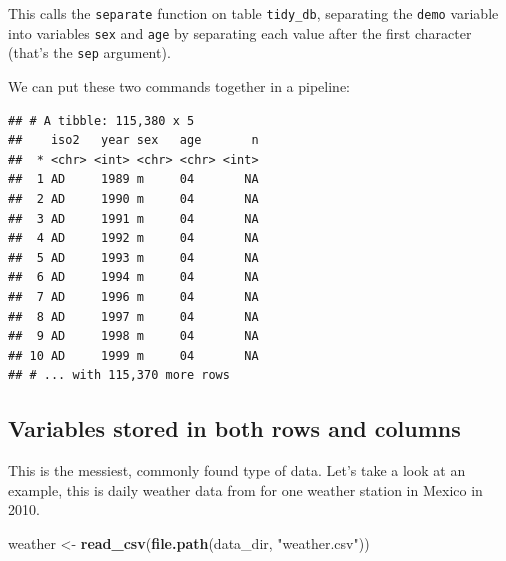\documentclass[12pt,]{book}
\newenvironment{Shaded}{\begin{snugshade}}{\end{snugshade}}
\newcommand{\KeywordTok}[1]{\textcolor[rgb]{0.13,0.29,0.53}{\textbf{#1}}}
\newcommand{\DataTypeTok}[1]{\textcolor[rgb]{0.13,0.29,0.53}{#1}}
\newcommand{\DecValTok}[1]{\textcolor[rgb]{0.00,0.00,0.81}{#1}}
\newcommand{\StringTok}[1]{\textcolor[rgb]{0.31,0.60,0.02}{#1}}
\newcommand{\OperatorTok}[1]{\textcolor[rgb]{0.81,0.36,0.00}{\textbf{#1}}}
\newcommand{\NormalTok}[1]{#1}
\theoremstyle{definition}
\theoremstyle{definition}
\theoremstyle{definition}
\theoremstyle{remark}
\begin{document}
This calls the \texttt{separate} function on table \texttt{tidy\_db},
separating the \texttt{demo} variable into variables \texttt{sex} and
\texttt{age} by separating each value after the first character (that's
the \texttt{sep} argument).

We can put these two commands together in a pipeline:

\begin{Shaded}
\end{Shaded}

\begin{verbatim}
## # A tibble: 115,380 x 5
##    iso2   year sex   age       n
##  * <chr> <int> <chr> <chr> <int>
##  1 AD     1989 m     04       NA
##  2 AD     1990 m     04       NA
##  3 AD     1991 m     04       NA
##  4 AD     1992 m     04       NA
##  5 AD     1993 m     04       NA
##  6 AD     1994 m     04       NA
##  7 AD     1996 m     04       NA
##  8 AD     1997 m     04       NA
##  9 AD     1998 m     04       NA
## 10 AD     1999 m     04       NA
## # ... with 115,370 more rows
\end{verbatim}

\subsection{Variables stored in both rows and
columns}\label{variables-stored-in-both-rows-and-columns}

This is the messiest, commonly found type of data. Let's take a look at
an example, this is daily weather data from for one weather station in
Mexico in 2010.

\begin{Shaded}
\begin{Highlighting}[]
\NormalTok{weather <-}\StringTok{ }\KeywordTok{read_csv}\NormalTok{(}\KeywordTok{file.path}\NormalTok{(data_dir, }\StringTok{"weather.csv"}\NormalTok{))}
\end{Highlighting}
\end{Shaded}
\end{document}

